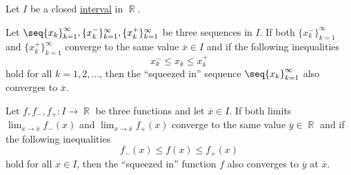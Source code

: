 \begin{lemma}\label{thm:squeeze_lemma}
  Let \( I \) be a closed \hyperref[def:order_interval/closed]{interval} in \( \BbbR \).

  \begin{thmenum}
     Let \( \seq{ x_k }_{k=1}^\infty, \{ x_k^- \}_{k=1}^\infty, \{ x_k^+ \}_{k=1}^\infty \) be three sequences in \( I \). If both \( \{ x_k^- \}_{k=1}^\infty \) and \( \{ x_k^+ \}_{k=1}^\infty \) converge to the same value \( \overline x \in I \) and if the following inequalities
    \begin{equation*}
      x_k^- \leq x_k \leq x_k^+
    \end{equation*}
    hold for all \( k = 1, 2, \ldots \), then the \enquote{squeezed in} sequence \( \seq{ x_k }_{k=1}^\infty \) also converges to \( \overline x \).

     Let \( f, f_-, f_+: I \to \BbbR \) be three functions and let \( \overline x \in I \). If both limits \( \lim_{x \to \overline x} f_-(x) \) and \( \lim_{x \to \overline x} f_+(x) \) converge to the same value \( \overline y \in \BbbR \) and if the following inequalities
    \begin{equation*}
      f_-(x) \leq f(x) \leq f_+(x)
    \end{equation*}
    hold for all \( x \in I \), then the \enquote{squeezed in} function \( f \) also converges to \( \overline y \) at \( \overline x \).
  \end{thmenum}
\end{lemma}
